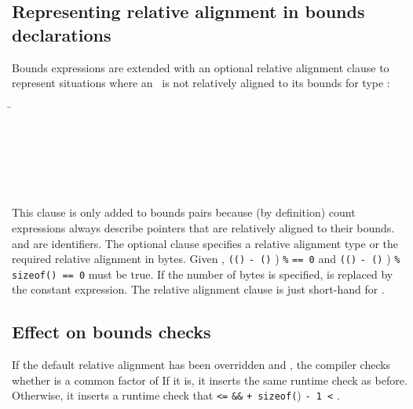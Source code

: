 \subsection{Representing relative alignment in bounds declarations}
\label{section:representing-relative-alignment}

Bounds expressions are extended with an optional relative alignment 
clause to represent situations where an \arrayptrT\ is not relatively 
aligned to its bounds for type :

\begin{tabbing}
\=\\
\> \var{\ldots{}}\\
\> 
          \\
\\
\\
\>  \\
\>  
\end{tabbing}

This clause is only added to bounds pairs because (by definition) count
expressions always describe pointers that are relatively aligned to
their bounds.   and  are
identifiers.  The optional clause specifies a
relative alignment type  or the required relative alignment in
bytes.  Given
,
\lstinline|((|\arrayptrchar\lstinline|)|  \lstinline|- (|\arrayptrchar\lstinline|)| ) 
        \lstinline|%| \lstinline|== 0| and
\lstinline|((|\arrayptrchar\lstinline|)|  \lstinline|- (|\arrayptrchar\lstinline|)| ) 
        \lstinline|% sizeof(|\lstinline|) == 0| must be true. If the number of bytes is
specified,  is replaced by the
constant expression.  The relative alignment clause 
is just short-hand for .

\subsection{Effect on bounds checks}

If the default relative alignment has been overridden and
, the compiler checks whether
 is a common factor of 
If it is, it inserts the same
runtime check as before. Otherwise, it inserts a runtime check that
 \lstinline|<=|  \lstinline|&&| 
 \lstinline|+ sizeof(|) \lstinline|- 1 <| .

